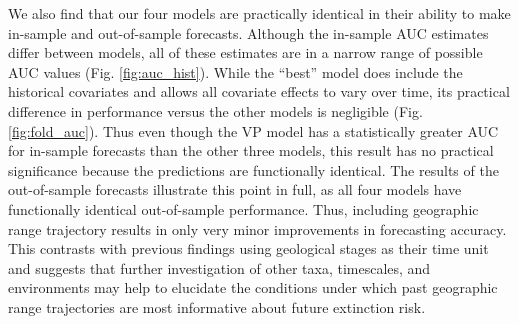 \documentclass[12pt,letterpaper]{article}
\begin{document}
\begin{refsection}

We also find that our four models are practically identical in their ability to make in-sample and out-of-sample forecasts. Although the in-sample AUC estimates differ between models, all of these estimates are in a narrow range of possible AUC values (Fig. \ref{fig:auc_hist}). While the ``best'' model does include the historical covariates and allows all covariate effects to vary over time, its practical difference in performance versus the other models is negligible (Fig. \ref{fig:fold_auc}). Thus even though the VP model has a statistically greater AUC for in-sample forecasts than the other three models, this result has no practical significance because the predictions are functionally identical. The results of the out-of-sample forecasts illustrate this point in full, as all four models have functionally identical out-of-sample performance. Thus, including geographic range trajectory results in only very minor improvements in forecasting accuracy. This contrasts with previous findings using geological stages as their time unit \citep{Kiessling2016} and suggests that further investigation of other taxa, timescales, and environments may help to elucidate the conditions under which past geographic range trajectories are most informative about future extinction risk.



\end{refsection}
\end{document}
